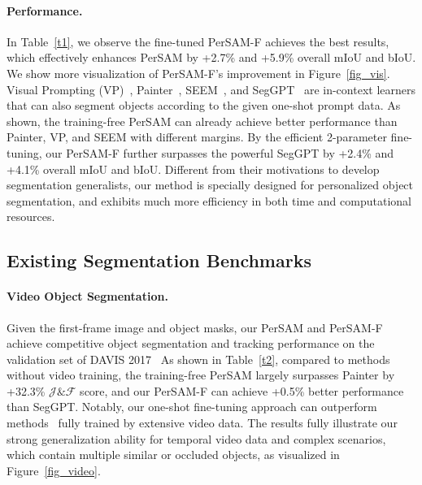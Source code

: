 \documentclass{article} \usepackage{iclr2024_conference,times}
\begin{document}
\paragraph{Performance.}
In Table~\ref{t1}, we observe the fine-tuned PerSAM-F achieves the best results, which effectively enhances PerSAM by +2.7\% and +5.9\% overall mIoU and bIoU. We show more visualization of PerSAM-F's improvement in Figure~\ref{fig_vis}.
Visual Prompting (VP)~\citep{bar2022visual}, Painter~\citep{wang2022images}, SEEM~\citep{zou2023segment}, and SegGPT~\citep{wang2023seggpt} are in-context learners that can also segment objects according to the given one-shot prompt data.
As shown, the training-free PerSAM can already achieve better performance than Painter, VP, and SEEM with different margins. By the efficient 2-parameter fine-tuning, our PerSAM-F further surpasses the powerful SegGPT by +2.4\% and +4.1\% overall mIoU and bIoU. Different from their motivations to develop segmentation generalists, our method is specially designed for personalized object segmentation, and exhibits much more efficiency in both time and computational resources.



\subsection{Existing Segmentation Benchmarks}
\label{s4.2}


\paragraph{Video Object Segmentation.}
Given the first-frame image and object masks, our PerSAM and PerSAM-F achieve competitive object segmentation and tracking performance on the validation set of DAVIS 2017~\citep{pont20172017} 
As shown in Table~\ref{t2}, compared to methods without video training, the training-free PerSAM largely surpasses Painter by +32.3\% $\mathcal{J}\&\mathcal{F}$ score, and our PerSAM-F can achieve +0.5\% better performance than SegGPT. Notably, our one-shot fine-tuning approach can outperform methods~\citep{lin2019agss,liang2020video} fully trained by extensive video data. The results fully illustrate our strong generalization ability for temporal video data and complex scenarios, which contain multiple similar or occluded objects, as visualized in Figure~\ref{fig_video}.
\vspace{-0.1cm}
\end{document}
